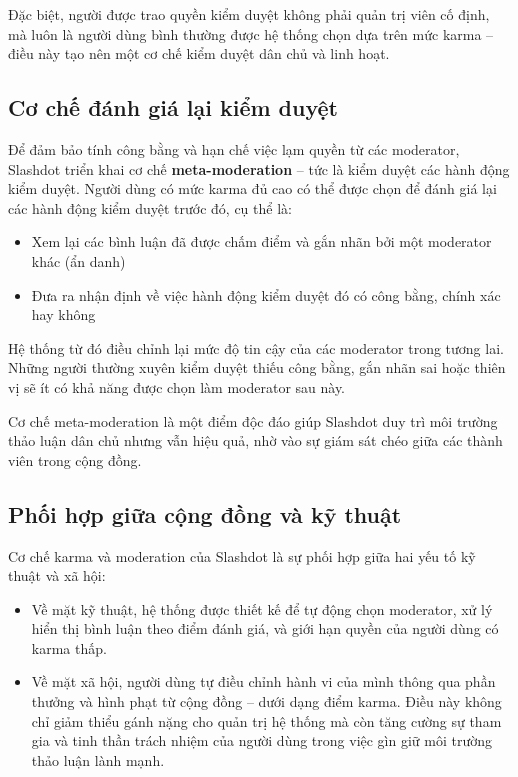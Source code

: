 Đặc biệt, người được trao quyền kiểm duyệt không phải quản trị viên cố định, mà luôn là người dùng bình thường được hệ thống chọn dựa trên mức karma --
điều này tạo nên một cơ chế kiểm duyệt dân chủ và linh hoạt.

\subsection{Cơ chế đánh giá lại kiểm duyệt}

Để đảm bảo tính công bằng và hạn chế việc lạm quyền từ các moderator, Slashdot triển khai cơ chế \textbf{meta-moderation} -- tức là kiểm duyệt các hành động kiểm duyệt.
Người dùng có mức karma đủ cao có thể được chọn để đánh giá lại các hành động kiểm duyệt trước đó, cụ thể là:
\begin{itemize}
  \item Xem lại các bình luận đã được chấm điểm và gắn nhãn bởi một moderator khác (ẩn danh)
  \item Đưa ra nhận định về việc hành động kiểm duyệt đó có công bằng, chính xác hay không
\end{itemize}

Hệ thống từ đó điều chỉnh lại mức độ tin cậy của các moderator trong tương lai. Những người thường xuyên kiểm duyệt thiếu công bằng, gắn nhãn sai hoặc thiên vị sẽ ít có khả năng được chọn làm moderator sau này.

Cơ chế meta-moderation là một điểm độc đáo giúp Slashdot duy trì môi trường thảo luận dân chủ nhưng vẫn hiệu quả, nhờ vào sự giám sát chéo giữa các thành viên trong cộng đồng.

\subsection{Phối hợp giữa cộng đồng và kỹ thuật}

Cơ chế karma và moderation của Slashdot là sự phối hợp giữa hai yếu tố kỹ thuật và xã hội:
\begin{itemize}
  \item Về mặt kỹ thuật, hệ thống được thiết kế để tự động chọn moderator, xử lý hiển thị bình luận theo điểm đánh giá, và giới hạn quyền của người dùng có karma thấp.
  \item Về mặt xã hội, người dùng tự điều chỉnh hành vi của mình thông qua phần thưởng và hình phạt từ cộng đồng -- dưới dạng điểm karma. Điều này không chỉ giảm thiểu gánh nặng cho quản trị hệ thống mà còn tăng cường sự tham gia và tinh thần trách nhiệm của người dùng trong việc gìn giữ môi trường thảo luận lành mạnh.
\end{itemize}
